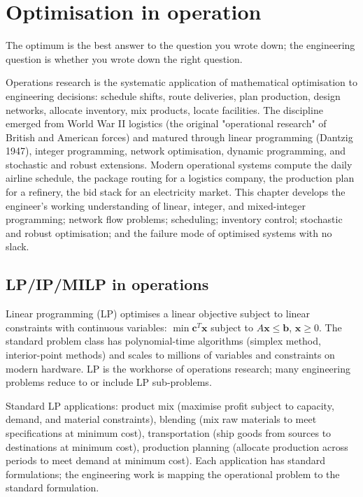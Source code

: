 \chapter{Optimisation in operation}
\label{vol09:ch09}

\epigraph{The optimum is the best answer to the question you wrote down; the engineering question is whether you wrote down the right question.}{}


\noindent
Operations research is the systematic application of mathematical optimisation to engineering decisions: schedule shifts, route deliveries, plan production, design networks, allocate inventory, mix products, locate facilities. The discipline emerged from World War II logistics (the original "operational research" of British and American forces) and matured through linear programming (Dantzig 1947), integer programming, network optimisation, dynamic programming, and stochastic and robust extensions. Modern operational systems compute the daily airline schedule, the package routing for a logistics company, the production plan for a refinery, the bid stack for an electricity market. This chapter develops the engineer's working understanding of linear, integer, and mixed-integer programming; network flow problems; scheduling; inventory control; stochastic and robust optimisation; and the failure mode of optimised systems with no slack.

\section{LP/IP/MILP in operations}

Linear programming (LP) optimises a linear objective subject to linear constraints with continuous variables: $\min \mathbf{c}^T \mathbf{x}$ subject to $A\mathbf{x} \leq \mathbf{b}$, $\mathbf{x} \geq 0$. The standard problem class has polynomial-time algorithms (simplex method, interior-point methods) and scales to millions of variables and constraints on modern hardware. LP is the workhorse of operations research; many engineering problems reduce to or include LP sub-problems.

Standard LP applications: product mix (maximise profit subject to capacity, demand, and material constraints), blending (mix raw materials to meet specifications at minimum cost), transportation (ship goods from sources to destinations at minimum cost), production planning (allocate production across periods to meet demand at minimum cost). Each application has standard formulations; the engineering work is mapping the operational problem to the standard formulation.

